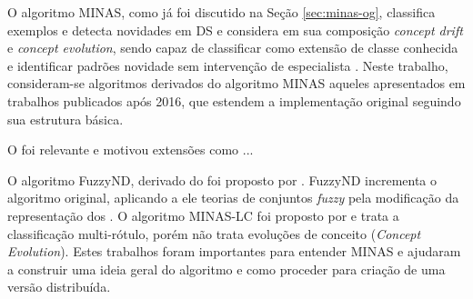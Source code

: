 O algoritmo MINAS, como já foi discutido na Seção \ref{sec:minas-og}, classifica
exemplos e detecta
novidades em DS e considera em sua composição \emph{concept drift} e
\emph{concept evolution}, sendo capaz de classificar como extensão de classe
conhecida e identificar padrões novidade sem intervenção de especialista
\cite{Faria2016minas}.
Neste trabalho, consideram-se algoritmos derivados do algoritmo MINAS
aqueles apresentados em trabalhos publicados após 2016, que estendem a
implementação original seguindo sua estrutura básica.

O \minas foi relevante e motivou extensões como \cite{DaSilva2018,Costa2019}...

O algoritmo FuzzyND, derivado do \minas foi proposto por .
FuzzyND incrementa o algoritmo original, aplicando a ele teorias de
conjuntos \emph{fuzzy} pela modificação da representação dos \clusters.
O algoritmo MINAS-LC foi proposto por  e trata a
classificação multi-rótulo, porém não trata evoluções de conceito (\emph{Concept
Evolution}).
Estes trabalhos foram importantes para entender MINAS e ajudaram a construir uma
ideia geral do algoritmo e como proceder para criação de uma versão distribuída.




